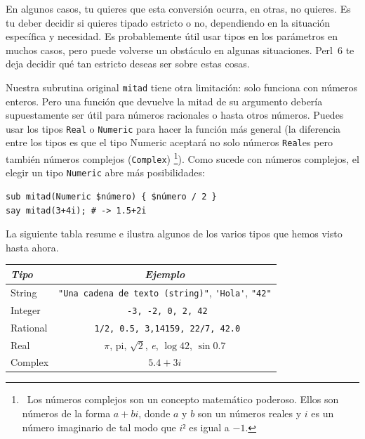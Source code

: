 En algunos casos, tu quieres que esta conversión ocurra,
en otras, no quieres. Es tu deber decidir si quieres
tipado estricto o no, dependiendo en la
situación específica y necesidad. Es probablemente útil usar 
tipos en los parámetros en muchos casos, pero puede 
volverse un obstáculo en algunas situaciones. Perl~6 te deja 
decidir qué tan estricto deseas ser sobre estas cosas.

Nuestra subrutina original {\tt mitad} tiene otra limitación: 
solo funciona con números enteros. Pero una función que 
devuelve la mitad de su argumento debería supuestamente
ser útil para números racionales o hasta otros números. 
Puedes usar los tipos {\tt Real}  o {\tt Numeric} para
hacer la función más general (la diferencia entre los
tipos  es que el tipo {Numeric} aceptará no solo números
{\tt Real}es pero también números complejos ({\tt Complex})
\footnote{~Los números complejos son un concepto matemático
poderoso. Ellos son números de la forma $a + bi$, donde 
$a$ y $b$ son un números reales y $i$ es un número imaginario
de tal modo que $i²$ es igual a $-1$.}). Como sucede con
números complejos, el elegir un tipo {\tt Numeric} abre más 
posibilidades:

\begin{verbatim}
sub mitad(Numeric $número) { $número / 2 }
say mitad(3+4i); # -> 1.5+2i
\end{verbatim}

La siguiente tabla resume e ilustra  algunos de los varios
tipos que hemos visto hasta ahora.

\begin{center}
\begin{tabular}{|l|c|}  \hline
\label{types}
\emph{Tipo} & \emph{Ejemplo}   \\ \hline
String      & \verb'"Una cadena de texto (string)"', \verb"'Hola'", \verb'"42"' \\ \hline
Integer     & \verb' -3, -2, 0, 2, 42' \\ \hline
Rational    & \verb' 1/2, 0.5, 3,14159, 22/7, 42.0' \\ \hline
Real        & $\pi$, pi, $\surd{2}$, \emph{e}, $\log 42$, $\sin 0.7$\\ \hline
Complex     & $5.4 + 3i$ \\ \hline
\end{tabular}
\end{center}


